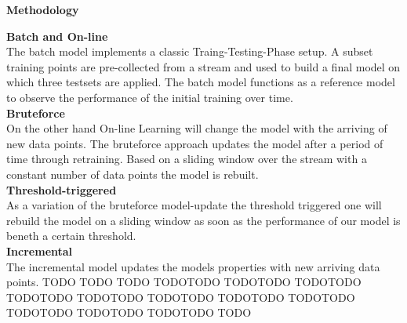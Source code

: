 \begin{center} \textbf{\huge Methodology} \end{center}
\textbf{\large Batch and On-line}\\
The batch model implements a classic Traing-Testing-Phase setup. A subset training points are pre-collected from a stream and used to build a final model on  which three testsets are applied. The batch model functions as a reference model to observe the performance of the initial training over time. \\
\textbf{\large Bruteforce}\\
On the other hand On-line Learning will change the model with the arriving of new data points.
The bruteforce approach updates the model after a period of time through retraining. Based on a sliding window over the stream with a constant number of data points 
the model is rebuilt.\\
\textbf{\large Threshold-triggered}\\
As a variation of the bruteforce model-update the threshold triggered one will rebuild the model on a sliding window as soon as the performance of our model is beneth a certain threshold. \\
\textbf{\large Incremental}\\
The incremental model updates the models properties with new arriving data points. \color{red}TODO TODO TODO TODOTODO TODOTODO TODOTODO TODOTODO TODOTODO TODOTODO TODOTODO TODOTODO TODOTODO TODOTODO TODOTODO TODO
